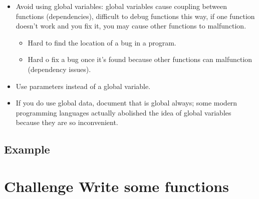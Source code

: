 \begin{itemize}
    \item Avoid using global variables: global variables cause coupling between functions (dependencies), difficult to debug functions this way, if one function doesn't work and you fix it, you may cause other functions to malfunction. 
        \begin{itemize}
            \item Hard to find the location of a bug in a program. 
            \item Hard o fix a bug once it's found because other functions can malfunction (dependency issues). 
        \end{itemize}
    \item Use parameters instead of a global variable. 
    \item If you do use global data, document that is global always; some modern programming languages actually abolished the idea of global variables because they are so inconvenient. 
\end{itemize}
\subsection{Example}


\section{Challenge Write some functions}
